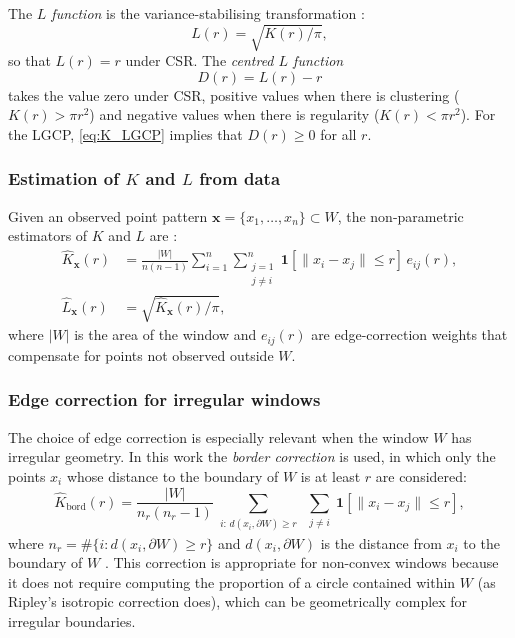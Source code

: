 \documentclass[a4paper,fleqn]{cas-sc}
\numberwithin{equation}{section}
\begin{document}
The \emph{$L$ function} is the variance-stabilising transformation
\citep{Besag1977}:
\begin{equation}
    L(r) = \sqrt{K(r)/\pi},
    \label{eq:L_function}
\end{equation}
so that $L(r)=r$ under CSR. The \emph{centred $L$ function}
\begin{equation}
    D(r) = L(r) - r
    \label{eq:D_function_theory}
\end{equation}
takes the value zero under CSR, positive values when there is
clustering ($K(r)>\pi r^2$) and negative values when there is
regularity ($K(r)<\pi r^2$). For the LGCP, \eqref{eq:K_LGCP} implies
that $D(r)\geq 0$ for all $r$.

\subsubsection{Estimation of $K$ and $L$ from data}

Given an observed point pattern $\mathbf{x}=\{x_1,\ldots,x_n\}\subset W$,
the non-parametric estimators of $K$ and $L$ are
\citep{Ripley88, spatstat}:
\begin{align}
    \widehat{K}_{\mathbf{x}}(r) &= \frac{|W|}{n(n-1)}\sum_{i=1}^{n}
    \sum_{\substack{j=1\\j\neq i}}^{n}
    \mathbf{1}[\|x_i-x_j\|\leq r]\,e_{ij}(r),
    \label{eq:K_hat} \\
    \widehat{L}_{\mathbf{x}}(r) &= \sqrt{\widehat{K}_{\mathbf{x}}(r)/\pi},
    \label{eq:L_hat}
\end{align}
where $|W|$ is the area of the window and $e_{ij}(r)$ are
edge-correction weights that compensate for points not observed
outside $W$.

\subsubsection{Edge correction for irregular windows}

The choice of edge correction is especially relevant when the window
$W$ has irregular geometry. In this work the \emph{border correction}
is used, in which only the points $x_i$ whose distance to the boundary
of $W$ is at least $r$ are considered:
\begin{equation}
    \widehat{K}_{\mathrm{bord}}(r) = \frac{|W|}{n_r(n_r-1)}
    \sum_{\substack{i:\,d(x_i,\partial W)\geq r}}
    \sum_{\substack{j\neq i}}
    \mathbf{1}[\|x_i-x_j\|\leq r],
    \label{eq:K_border}
\end{equation}
where $n_r = \#\{i : d(x_i,\partial W)\geq r\}$ and $d(x_i,\partial W)$
is the distance from $x_i$ to the boundary of $W$ \citep{spatstat}.
This correction is appropriate for non-convex windows because it does
not require computing the proportion of a circle contained within $W$
(as Ripley's isotropic correction does), which can be geometrically
complex for irregular boundaries.
\end{document}
